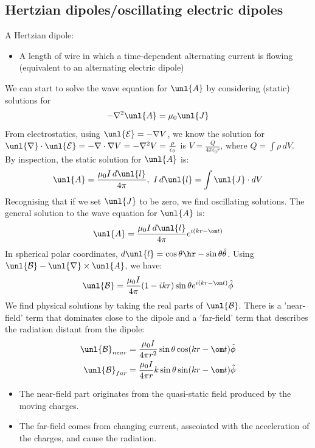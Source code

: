 \documentclass[a4paper, 11pt, normalem]{report}
\renewcommand\E{\mathcal{E}}
\newcommand\uE{\unl{\E}}
\renewcommand\B{\mathcal{B}}
\newcommand\uB{\unl{\B}}
\renewcommand\del{\unl{\nabla}}
\newcommand\eno{\epsilon_0}
\newcommand\J{\unl{J}}
\newcommand\A{\unl{A}}
\begin{document}
\subsection{Hertzian dipoles/oscillating electric dipoles}
A Hertzian dipole:
\begin{itemize}
	\item A length of wire in which a time-dependent alternating current is flowing (equivalent to an alternating electric dipole)
\end{itemize}
We can start to solve the wave equation for $\A$ by considering (static) solutions for
\begin{equation}
	-\nabla^2\A = \mu_0\J
\end{equation}
From electrostatics, using $\uE = -\nabla V$, we know the solution for $\del\cdot\uE = -\nabla\cdot\nabla V = -\nabla^2V = \frac{\rho}{\eno}$ is $V = \frac{Q}{4\pi\eno r}$, where $Q = \int \rho\,dV$. \\
By inspection, the static solution for $\A$ is:
\begin{equation}
	\A = \frac{\mu_0 I\,d\unl{l}}{4\pi},~ I\,d\unl{l} = \int \J\cdot dV
\end{equation}
Recognising that if we set $\J$ to be zero, we find oscillating solutions.
The general solution to the wave equation for $\A$ is:
\begin{equation}
	\A = \frac{\mu_0I\,d\unl{l}}{4\pi}e^{i(kr - \om t)}
\end{equation}
In spherical polar coordinates, $d\unl{l} = \cos\theta\hr - \sin\theta\hat{\theta}$.
Using $\uB - \del\times\A$, we have:
\begin{equation}
	\uB = \frac{\mu_0I}{4\pi}(1 - ikr)\sin\theta e^{i(kr - \om t)}\hat{\phi}
\end{equation}
We find physical solutions by taking the real parts of $\uB$.
There is a 'near-field' term that dominates close to the dipole and a 'far-field' term that describes the radiation distant from the dipole:
\begin{align}
	\uB_{near} &= \frac{\mu_0I}{4\pi r^2}\sin\theta \cos(kr - \om t)\hat{\phi} \\
	\uB_{far} &= \frac{\mu_0I}{4\pi r}k\sin\theta\sin(kr - \om t)\hat{\phi}
\end{align}
\begin{itemize}
	\item The near-field part originates from the quasi-static field produced by the moving charges.
	\item The far-field comes from changing current, asscoiated with the acceleration of the charges, and cause the radiation.
\end{itemize}
\end{document}
